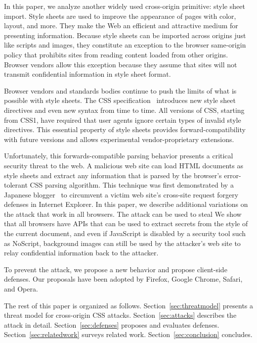 \documentclass{acm_proc_article-sp}
\begin{document}
In this paper, we analyze another widely used cross-origin primitive: style
sheet import. Style sheets are used to improve the appearance of pages with
color, layout, and more. They make the Web an efficient and attractive medium
for presenting information. Because style sheets can be imported across
origins just like scripts and images, they constitute an exception to the
browser same-origin policy that prohibits sites from reading content loaded
from other origins. Browser vendors allow this exception because they assume
that sites will not transmit confidential information in style sheet format.

Browser vendors and standards bodies continue to push the limits of what is
possible with style sheets. The CSS specification~\cite{cssspec} introduces
new style sheet directives and even new syntax from time to time. All versions
of CSS, starting from CSS1, have required that user agents ignore certain
types of invalid style directives. This essential property of style sheets
provides forward-compatibility with future versions and allows experimental
vendor-proprietary extensions.

Unfortunately, this forwards-compatible parsing behavior presents a critical
security threat to the web. A malicious web site can load HTML documents as
style sheets and extract any information that is parsed by the browser's
error-tolerant CSS parsing algorithm. This technique was first demonstrated by
a Japanese blogger~\cite{cssxss} to circumvent a victim web site's cross-site
request forgery defenses in Internet Explorer. In this paper, we describe
additional variations on the attack that work in all browsers. The attack can be used to steal We show that all browsers have APIs that can be used to extract secrets from the style of the current document, and even if JavaScript is disabled by a security tool such as NoScript, background images can still be used by the attacker's web site to relay confidential information back to the attacker.

To prevent the attack, we propose a new behavior and propose
client-side defenses. Our proposals have been adopted by Firefox, Google
Chrome, Safari, and Opera.

The rest of this paper is organized as follows. Section~\ref{sec:threatmodel} presents a threat model for cross-origin CSS attacks.
Section~\ref{sec:attacks} describes the attack in detail. Section~\ref{sec:defenses} proposes and evaluates defenses.
Section~\ref{sec:relatedwork} surveys related work.
Section~\ref{sec:conclusion} concludes.
\end{document}
